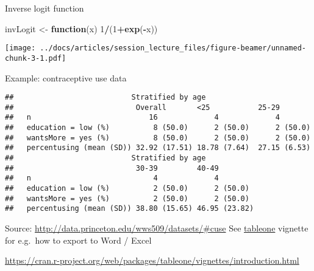 \documentclass[
  ignorenonframetext,
]{beamer}
\newenvironment{Shaded}{\begin{snugshade}}{\end{snugshade}}
\newcommand{\ControlFlowTok}[1]{\textcolor[rgb]{0.13,0.29,0.53}{\textbf{#1}}}
\newcommand{\DecValTok}[1]{\textcolor[rgb]{0.00,0.00,0.81}{#1}}
\newcommand{\KeywordTok}[1]{\textcolor[rgb]{0.13,0.29,0.53}{\textbf{#1}}}
\newcommand{\NormalTok}[1]{#1}
\newcommand{\OperatorTok}[1]{\textcolor[rgb]{0.81,0.36,0.00}{\textbf{#1}}}
\newcommand{\StringTok}[1]{\textcolor[rgb]{0.31,0.60,0.02}{#1}}
\begin{document}
\begin{frame}[fragile]{Inverse logit function}
\protect\hypertarget{inverse-logit-function}{}

\begin{Shaded}
\begin{Highlighting}[]
\NormalTok{invLogit <-}\StringTok{ }\ControlFlowTok{function}\NormalTok{(x) }\DecValTok{1}\OperatorTok{/}\NormalTok{(}\DecValTok{1}\OperatorTok{+}\KeywordTok{exp}\NormalTok{(}\OperatorTok{-}\NormalTok{x))}
\end{Highlighting}
\end{Shaded}

\texttt{[image: ../docs/articles/session\_lecture\_files/figure-beamer/unnamed-chunk-3-1.pdf]}

\end{frame}

\begin{frame}[fragile]{Example: contraceptive use data}
\protect\hypertarget{example-contraceptive-use-data}{}

\tiny

\begin{verbatim}
##                           Stratified by age
##                            Overall       <25           25-29        
##   n                           16             4             4        
##   education = low (%)          8 (50.0)      2 (50.0)      2 (50.0) 
##   wantsMore = yes (%)          8 (50.0)      2 (50.0)      2 (50.0) 
##   percentusing (mean (SD)) 32.92 (17.51) 18.78 (7.64)  27.15 (6.53) 
##                           Stratified by age
##                            30-39         40-49        
##   n                            4             4        
##   education = low (%)          2 (50.0)      2 (50.0) 
##   wantsMore = yes (%)          2 (50.0)      2 (50.0) 
##   percentusing (mean (SD)) 38.80 (15.65) 46.95 (23.82)
\end{verbatim}

Source: \url{http://data.princeton.edu/wws509/datasets/\#cuse} See
\href{https://cran.r-project.org/web/packages/tableone/vignettes/introduction.html}{tableone}
vignette for e.g.~how to export to Word / Excel

\url{https://cran.r-project.org/web/packages/tableone/vignettes/introduction.html}

\end{frame}
\end{document}
